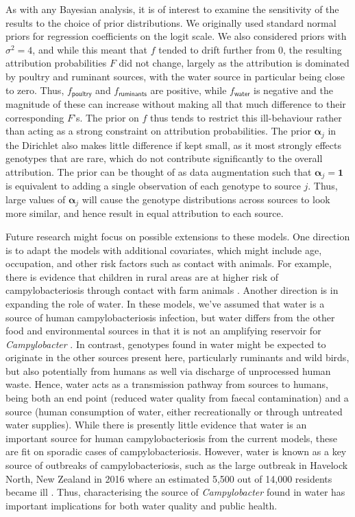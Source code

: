 \documentclass[AMA,STIX1COL]{WileyNJD-v2}
\begin{document}
As with any Bayesian analysis, it is of interest to examine the sensitivity of the results to the choice of prior distributions. We originally used standard normal priors for regression coefficients on the logit scale. We also considered priors with $\sigma^2=4$, and while this meant that $f$ tended to drift further from 0, the resulting attribution probabilities $F$ did not change, largely as the attribution is dominated by poultry and ruminant sources, with the water source in particular being close to zero. Thus, $f_\mathsf{poultry}$ and $f_\mathsf{ruminants}$ are positive, while $f_\mathsf{water}$ is negative and the magnitude of these can increase without making all that much difference to their corresponding $F$'s. The prior on $f$ thus tends to restrict this ill-behaviour rather than acting as a strong constraint on attribution probabilities. The prior $\boldsymbol{\alpha}_j$ in the Dirichlet also makes little difference if kept small, as it most strongly effects genotypes that are rare, which do not contribute significantly to the overall attribution. The prior can be thought of as data augmentation such that $\boldsymbol{\alpha}_j=\boldsymbol{1}$ is equivalent to adding a single observation of each genotype to source $j$. Thus, large values of $\boldsymbol{\alpha}_j$ will cause the genotype distributions across sources to look more similar, and hence result in equal attribution to each source.

Future research might focus on possible extensions to these models. One direction is to adapt the models with additional covariates, which might include age, occupation, and other risk factors such as contact with animals. For example, there is evidence that children in rural areas are at higher risk of campylobacteriosis through contact with farm animals \cite{MullM, Spencer2012}. Another direction is in expanding the role of water. In these models, we've assumed that water is a source of human campylobacteriosis infection, but water differs from the other food and environmental sources in that it is not an amplifying reservoir for \emph{Campylobacter} \cite{Wagen}. In contrast, genotypes found in water might be expected to originate in the other sources present here, particularly ruminants and wild birds, but also potentially from humans as well via discharge of unprocessed human waste. Hence, water acts as a transmission pathway from sources to humans, being both an end point (reduced water quality from faecal contamination) and a source (human consumption of water, either recreationally or through untreated water supplies). While there is presently little evidence that water is an important source for human campylobacteriosis from the current models, these are fit on sporadic cases of campylobacteriosis. However, water is known as a key source of outbreaks of campylobacteriosis, such as the large outbreak in Havelock North, New Zealand in 2016 where an estimated 5,500 out of 14,000 residents became ill \cite{dia_campy_report1}. Thus, characterising the source of \emph{Campylobacter} found in water has important implications for both water quality and public health.
\end{document}
